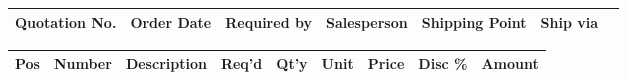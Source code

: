 \documentclass[10pt,a4paper,oneside,onecolumn]{scrartcl}
\begin{document}
\pagestyle{myheadings}
\thispagestyle{empty}


\begin{CJK}{UTF8}{arialuni}

\begin{longtable}{|*{7}{l|}|} \hline 
  \textbf{Quotation No.} & \textbf{Order Date} & \textbf{Required by}   & \textbf{Salesperson}
  & \textbf{Shipping Point} & \textbf{Ship via} \\ [0.5em]
\hline
\end{longtable}
\end{CJK}

\begin{longtable}{|c|c|p{5cm}|c|c|c|c|c|c|} \hline 
  \textbf{Pos} & \textbf{Number} & \textbf{Description} & \textbf{Req'd} &
\textbf{Qt'y} & \textbf{Unit} & \textbf{Price} & \textbf{Disc \%} & \textbf{Amount} \\
\hline
\end{longtable}
\end{document}
